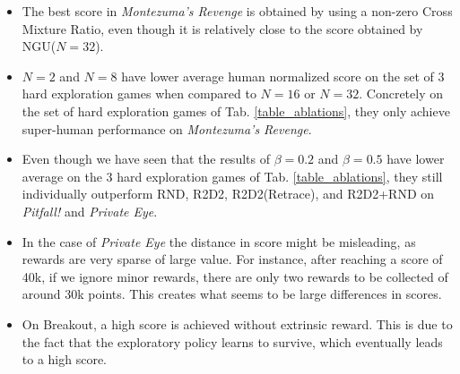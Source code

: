 \documentclass{article} %
\begin{document}
\begin{itemize}
    \item The best score in \textit{Montezuma's Revenge} is obtained by using a non-zero Cross Mixture Ratio, even though it is relatively close to the score obtained by NGU($N=32$).
    \item $N=2$ and $N=8$ have lower average human normalized score on the set of $3$ hard exploration games when compared to $N=16$ or $N=32$. Concretely on the set of hard exploration games of Tab. \ref{table_ablations}, they only achieve super-human performance on \textit{Montezuma's Revenge}.
    \item Even though we have seen that the results of $\beta = 0.2$ and $\beta = 0.5$ have lower average on the $3$ hard exploration games of Tab. \ref{table_ablations}, they still individually outperform RND, R2D2, R2D2(Retrace), and R2D2+RND on \textit{Pitfall!} and \textit{Private Eye}. 
    \item In the case of \textit{Private Eye} the distance in score might be misleading, as rewards are very sparse of large value. For instance, after reaching a score of 40k, if we ignore minor rewards, there are only two rewards to be collected of around 30k points. This creates what seems to be large differences in scores.
    \item On Breakout, a high score is achieved without extrinsic reward. This is due to the fact that the exploratory policy learns to survive, which eventually leads to a high score.
\end{itemize}
\end{document}
